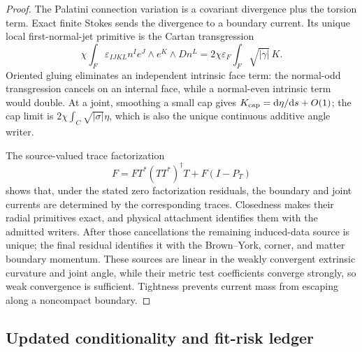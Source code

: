 \documentclass[11pt]{article}
\theoremstyle{definition}
\theoremstyle{remark}
\newcommand{\dd}{\mathrm d}
\begin{document}
\begin{proof}
The Palatini connection variation is a covariant divergence plus the torsion
term.  Exact finite Stokes sends the divergence to a boundary current.  Its
unique local first-normal-jet primitive is the Cartan transgression
\[
 \chi\int_F\varepsilon_{IJKL}n^Ie^J\wedge e^K\wedge Dn^L
 =2\chi\varepsilon_F\int_F\sqrt{|\gamma|}\,K.
\]
Oriented gluing eliminates an independent intrinsic face term: the
normal-odd transgression cancels on an internal face, while a normal-even
intrinsic term would double.  At a joint, smoothing a small cap gives
\(K_{\rm cap}=\dd\eta/\dd s+O(1)\); the cap limit is
\(2\chi\int_C\sqrt{|\sigma|}\eta\), which is also the unique continuous
additive angle writer.

The source-valued trace factorization
\[
 F=FT^*(TT^*)^\dagger T+F(I-P_T)
\]
shows that, under the stated zero factorization residuals, the boundary and
joint currents are determined by the corresponding traces.  Closedness makes
their radial primitives exact, and physical attachment identifies them with
the admitted writers.  After those cancellations the remaining induced-data
source is unique; the final residual identifies it with the Brown--York,
corner, and matter boundary momentum.  These sources are linear in the weakly
convergent extrinsic curvature and joint angle, while their metric test
coefficients converge strongly, so weak convergence is sufficient.  Tightness
prevents current mass from escaping along a noncompact boundary.
\end{proof}

\subsection{Updated conditionality and fit-risk ledger}
\end{document}
